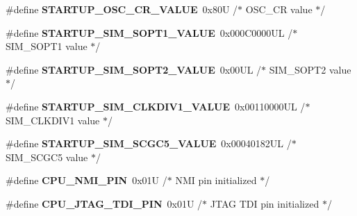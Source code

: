 \begin{DoxyCompactItemize}
\item 
\#define {\bfseries S\+T\+A\+R\+T\+U\+P\+\_\+\+O\+S\+C\+\_\+\+C\+R\+\_\+\+V\+A\+L\+UE}~0x80\+U     /$\ast$ O\+S\+C\+\_\+\+C\+R value $\ast$/\hypertarget{group___c_p_u___config__module_ga6c537c467895773b1298aed8d2ef59f9}{}\label{group___c_p_u___config__module_ga6c537c467895773b1298aed8d2ef59f9}

\item 
\#define {\bfseries S\+T\+A\+R\+T\+U\+P\+\_\+\+S\+I\+M\+\_\+\+S\+O\+P\+T1\+\_\+\+V\+A\+L\+UE}~0x000\+C0000\+U\+L /$\ast$ S\+I\+M\+\_\+\+S\+O\+P\+T1 value $\ast$/\hypertarget{group___c_p_u___config__module_ga49ec10b290d9f6fa487837141d2d9550}{}\label{group___c_p_u___config__module_ga49ec10b290d9f6fa487837141d2d9550}

\item 
\#define {\bfseries S\+T\+A\+R\+T\+U\+P\+\_\+\+S\+I\+M\+\_\+\+S\+O\+P\+T2\+\_\+\+V\+A\+L\+UE}~0x00\+U\+L    /$\ast$ S\+I\+M\+\_\+\+S\+O\+P\+T2 value $\ast$/\hypertarget{group___c_p_u___config__module_gaca7fc6e2f7d65c322135e7de5e2afd5f}{}\label{group___c_p_u___config__module_gaca7fc6e2f7d65c322135e7de5e2afd5f}

\item 
\#define {\bfseries S\+T\+A\+R\+T\+U\+P\+\_\+\+S\+I\+M\+\_\+\+C\+L\+K\+D\+I\+V1\+\_\+\+V\+A\+L\+UE}~0x00110000\+U\+L /$\ast$ S\+I\+M\+\_\+\+C\+L\+K\+D\+I\+V1 value $\ast$/\hypertarget{group___c_p_u___config__module_ga45a0c8306c30f6aa1c768b782d72658e}{}\label{group___c_p_u___config__module_ga45a0c8306c30f6aa1c768b782d72658e}

\item 
\#define {\bfseries S\+T\+A\+R\+T\+U\+P\+\_\+\+S\+I\+M\+\_\+\+S\+C\+G\+C5\+\_\+\+V\+A\+L\+UE}~0x00040182\+U\+L /$\ast$ S\+I\+M\+\_\+\+S\+C\+G\+C5 value $\ast$/\hypertarget{group___c_p_u___config__module_ga26e1feaac1bb60afd4098e35174de62e}{}\label{group___c_p_u___config__module_ga26e1feaac1bb60afd4098e35174de62e}

\item 
\#define {\bfseries C\+P\+U\+\_\+\+N\+M\+I\+\_\+\+P\+IN}~0x01\+U     /$\ast$ N\+M\+I pin initialized $\ast$/\hypertarget{group___c_p_u___config__module_ga81bd1cc3f10cc4f0892d9adf9392e450}{}\label{group___c_p_u___config__module_ga81bd1cc3f10cc4f0892d9adf9392e450}

\item 
\#define {\bfseries C\+P\+U\+\_\+\+J\+T\+A\+G\+\_\+\+T\+D\+I\+\_\+\+P\+IN}~0x01\+U     /$\ast$ J\+T\+A\+G T\+D\+I pin initialized $\ast$/\hypertarget{group___c_p_u___config__module_gaa60b83e67c340ef4871db75e54809b74}{}\label{group___c_p_u___config__module_gaa60b83e67c340ef4871db75e54809b74}


\end{DoxyCompactItemize}
